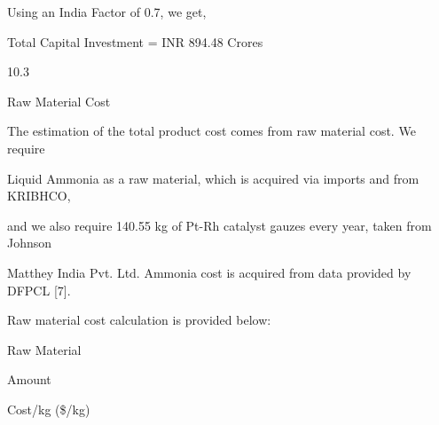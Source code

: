 \documentclass[a4paper,portrait,12pt]{article}
\begin{document}
\begin{flushleft}
Using an India Factor of 0.7, we get,
\end{flushleft}


\begin{flushleft}
Total Capital Investment = INR 894.48 Crores
\end{flushleft}





10.3





\begin{flushleft}
Raw Material Cost
\end{flushleft}





\begin{flushleft}
The estimation of the total product cost comes from raw material cost. We require
\end{flushleft}


\begin{flushleft}
Liquid Ammonia as a raw material, which is acquired via imports and from KRIBHCO,
\end{flushleft}


\begin{flushleft}
and we also require 140.55 kg of Pt-Rh catalyst gauzes every year, taken from Johnson
\end{flushleft}


\begin{flushleft}
Matthey India Pvt. Ltd. Ammonia cost is acquired from data provided by DFPCL [7].
\end{flushleft}


\begin{flushleft}
Raw material cost calculation is provided below:
\end{flushleft}


\begin{flushleft}
Raw Material
\end{flushleft}





\begin{flushleft}
Amount
\end{flushleft}





\begin{flushleft}
Cost/kg (\$/kg)
\end{flushleft}
\end{document}
